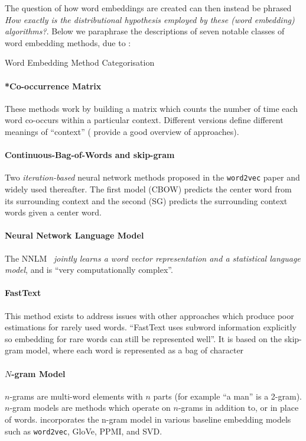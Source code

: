 \documentclass{ucetd}
\begin{document}
The question of how word embeddings are created can then instead be phrased \emph{How exactly is the distributional hypothesis employed by these (word embedding) algorithms?}. Below we paraphrase the descriptions of seven notable classes of word embedding methods, due to \textcite{wang-2019-evaluating}:
\begin{infobox}{Word Embedding Method Categorisation}
  \paragraph{*Co-occurrence Matrix}\label{cooccurrence-matrix-models} These methods work by building a matrix which counts the number of time each word co-occurs within a particular context. Different versions define different meanings of ``context''  (\textcite{turney10-from-frequen-to-meanin, sahlgreen-2006-the-word-space-model} provide a good overview of approaches).
  \paragraph{Continuous-Bag-of-Words and skip-gram}\label{word2vec-models} Two \emph{iteration-based} neural network methods proposed in the \texttt{word2vec} paper \parencite{mikolov13-effic-estim-word-repres-vector-space} and widely used thereafter. The first model (CBOW) predicts the center word from its surrounding context and the second (SG) predicts the surrounding context words given a center word.
  \paragraph{Neural Network Language Model}\label{nnl-model} The NNLM~\parencite{bengio-2003-a-neural-prob-lang-model} \emph{jointly learns a word vector representation and a statistical language model}, and is ``very computationally complex''.
  \paragraph{FastText}\label{fasttext} This method exists to address issues with other approaches which produce poor estimations for rarely used words. ``FastText uses subword information explicitly so embedding for rare words can still be represented well''. It is based on the skip-gram model, where each word is represented as a bag of character 
  \paragraph{$N$-gram Model}\label{n-gram-model} $n$-grams are multi-word elements with $n$ parts (for example ``a man'' is a 2-gram). $n$-gram models are methods which operate on $n$-grams in addition to, or in place of words. \textcite{zhao-etal-2017-ngram2vec} incorporates the n-gram model in various baseline embedding models such as \texttt{word2vec}, GloVe, PPMI, and SVD.

\end{infobox}
\end{document}
